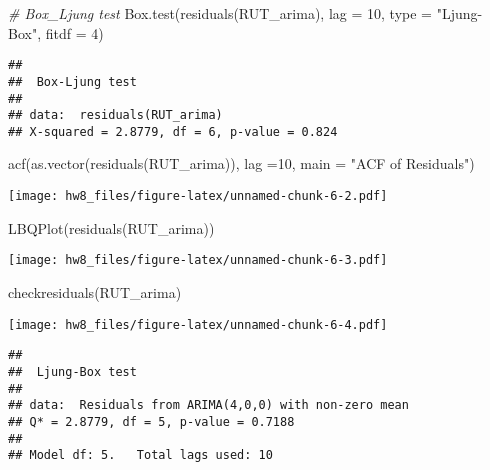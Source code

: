 \documentclass[
]{article}
\newenvironment{Shaded}{\begin{snugshade}}{\end{snugshade}}
\newcommand{\AttributeTok}[1]{\textcolor[rgb]{0.77,0.63,0.00}{#1}}
\newcommand{\CommentTok}[1]{\textcolor[rgb]{0.56,0.35,0.01}{\textit{#1}}}
\newcommand{\DecValTok}[1]{\textcolor[rgb]{0.00,0.00,0.81}{#1}}
\newcommand{\FunctionTok}[1]{\textcolor[rgb]{0.00,0.00,0.00}{#1}}
\newcommand{\NormalTok}[1]{#1}
\newcommand{\StringTok}[1]{\textcolor[rgb]{0.31,0.60,0.02}{#1}}
\begin{document}
\begin{Shaded}
\begin{Highlighting}[]
\CommentTok{\# Box\_Ljung test}
\FunctionTok{Box.test}\NormalTok{(}\FunctionTok{residuals}\NormalTok{(RUT\_arima), }\AttributeTok{lag =} \DecValTok{10}\NormalTok{, }\AttributeTok{type =} \StringTok{"Ljung{-}Box"}\NormalTok{, }\AttributeTok{fitdf =} \DecValTok{4}\NormalTok{)}
\end{Highlighting}
\end{Shaded}

\begin{verbatim}
## 
##  Box-Ljung test
## 
## data:  residuals(RUT_arima)
## X-squared = 2.8779, df = 6, p-value = 0.824
\end{verbatim}

\begin{Shaded}
\begin{Highlighting}[]
\FunctionTok{acf}\NormalTok{(}\FunctionTok{as.vector}\NormalTok{(}\FunctionTok{residuals}\NormalTok{(RUT\_arima)), }\AttributeTok{lag =}\DecValTok{10}\NormalTok{, }\AttributeTok{main =} \StringTok{"ACF of Residuals"}\NormalTok{)}
\end{Highlighting}
\end{Shaded}

\texttt{[image: hw8\_files/figure-latex/unnamed-chunk-6-2.pdf]}

\begin{Shaded}
\begin{Highlighting}[]
\FunctionTok{LBQPlot}\NormalTok{(}\FunctionTok{residuals}\NormalTok{(RUT\_arima))}
\end{Highlighting}
\end{Shaded}

\texttt{[image: hw8\_files/figure-latex/unnamed-chunk-6-3.pdf]}

\begin{Shaded}
\begin{Highlighting}[]
\FunctionTok{checkresiduals}\NormalTok{(RUT\_arima)}
\end{Highlighting}
\end{Shaded}

\texttt{[image: hw8\_files/figure-latex/unnamed-chunk-6-4.pdf]}

\begin{verbatim}
## 
##  Ljung-Box test
## 
## data:  Residuals from ARIMA(4,0,0) with non-zero mean
## Q* = 2.8779, df = 5, p-value = 0.7188
## 
## Model df: 5.   Total lags used: 10
\end{verbatim}
\end{document}
